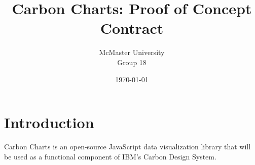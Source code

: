 \documentclass{article}
\title{Carbon Charts: Proof of Concept Contract}
\author{
    McMaster University\\
    Group 18 \\
}
\date{\today}
\begin{document}
\maketitle









\section{Introduction}
Carbon Charts is an open-source JavaScript data visualization library that will be used as a functional component of IBM's Carbon Design System.\\
\end{document}
